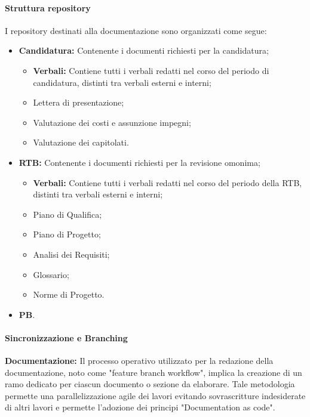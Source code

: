 \documentclass{article}
\begin{document}
\paragraph{Struttura repository}
I repository destinati alla documentazione sono organizzati come segue:
\begin{itemize}
    \item \textbf{Candidatura:} Contenente i documenti richiesti per la candidatura;
    \begin{itemize}
        \item \textbf{Verbali:} Contiene tutti i verbali redatti nel corso del periodo di candidatura, distinti tra verbali esterni e interni;
        \item Lettera di presentazione;
        \item Valutazione dei costi e assunzione impegni;
        \item Valutazione dei capitolati.
    \end{itemize}
    \item \textbf{RTB:} Contenente i documenti richiesti per la revisione omonima;
    \begin{itemize}
        \item \textbf{Verbali:} Contiene tutti i verbali redatti nel corso del periodo della RTB, distinti tra verbali esterni e interni;
              \item Piano di Qualifica; 
              \item Piano di Progetto;
              \item Analisi dei Requisiti;
              \item Glossario;
              \item Norme di Progetto.
          \end{itemize}
    \item \textbf{PB}.
\end{itemize}


\paragraph{Sincronizzazione e Branching}
\textbf{Documentazione:}
Il processo operativo utilizzato per la redazione della documentazione, noto come "feature branch workflow", implica la creazione di un ramo dedicato per ciascun documento o sezione da elaborare.
Tale metodologia permette una parallelizzazione agile dei lavori evitando sovrascritture indesiderate di altri lavori e permette l'adozione dei principi "Documentation as code". %
\end{document}
